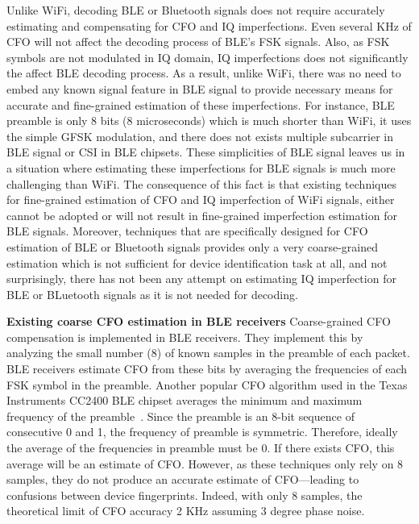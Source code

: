 Unlike WiFi, decoding BLE or Bluetooth signals does not require accurately
estimating and compensating for CFO and IQ imperfections.
%
Even several KHz of CFO will not affect the decoding process of BLE's FSK
signals. Also, as FSK symbols are not modulated in IQ domain, IQ imperfections
does not significantly the affect BLE decoding process.
%
As a result, unlike WiFi, there was no need to embed any known signal feature
in BLE signal to provide necessary means for accurate and fine-grained
estimation of these imperfections.
%
For instance, BLE preamble is only 8 bits (8 microseconds) which is much
shorter than WiFi, it uses the simple GFSK modulation, and there does not
exists multiple subcarrier in BLE signal or CSI in BLE chipsets. These
simplicities of BLE signal leaves us in a situation where estimating these
imperfections for BLE signals is much more challenging than WiFi.
The consequence of this fact is that existing techniques for fine-grained
estimation of CFO and IQ imperfection of WiFi signals, either cannot be
adopted or will not result in fine-grained imperfection estimation for BLE
signals.  Moreover, techniques that are specifically designed for CFO
estimation of BLE or Bluetooth signals provides only a very coarse-grained
estimation which is not sufficient for device identification task at all, and
not surprisingly, there has not been any attempt on estimating IQ imperfection
for BLE or BLuetooth signals as it is not needed for decoding.
\fi

\vspace{0.5em}
\noindent\textbf{Existing coarse CFO estimation in BLE receivers}
Coarse-grained CFO compensation is implemented in BLE receivers.  They
implement this by analyzing the small number (8) of known samples in the
preamble of each packet.
%
BLE receivers estimate CFO from these bits by averaging the frequencies of each
FSK symbol in the preamble. Another popular CFO algorithm used in the Texas
Instruments CC2400 BLE chipset averages the minimum and maximum frequency of
the preamble~\cite{cvtracksun}.
%
Since the preamble is an 8-bit sequence of consecutive 0 and 1, the frequency
of preamble is symmetric.  Therefore, ideally the average of the frequencies in
preamble must be 0. If there exists CFO, this average will be an estimate of
CFO.
%
However, as these techniques only rely on 8 samples, they do not produce an
accurate estimate of CFO---leading to confusions between device fingerprints.
%
Indeed, with only 8 samples, the theoretical limit of CFO accuracy 2 KHz assuming 3 degree
phase noise.
%

